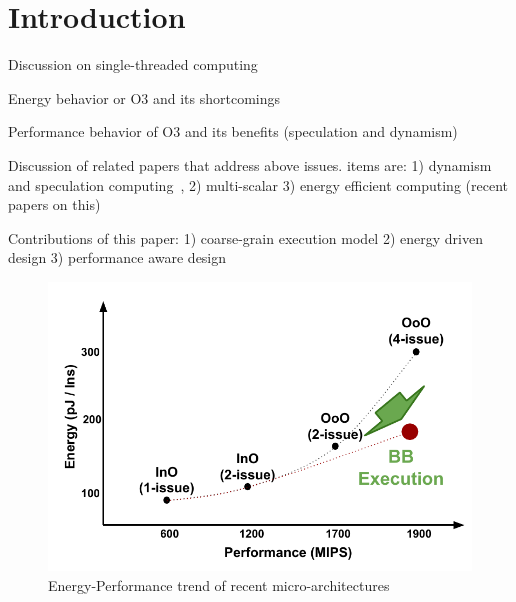 \section{Introduction} 
\label{sec:intro}

Discussion on single-threaded computing

Energy behavior or O3 and its shortcomings

Performance behavior of O3 and its benefits (speculation and dynamism)

Discussion of related papers that address above issues. items are: 
1) dynamism and speculation computing~\cite{dyn_specul},
2) multi-scalar
3) energy efficient computing (recent papers on this)

Contributions of this paper: 
1) coarse-grain execution model
2) energy driven design
3) performance aware design


\begin{figure}[h]
	\centering
	\includegraphics[width=1.0\columnwidth]{fig/energy_perf_insight.pdf} 
	\caption{Energy-Performance trend of recent micro-architectures}
	\label{fig:insight}
\end{figure}


